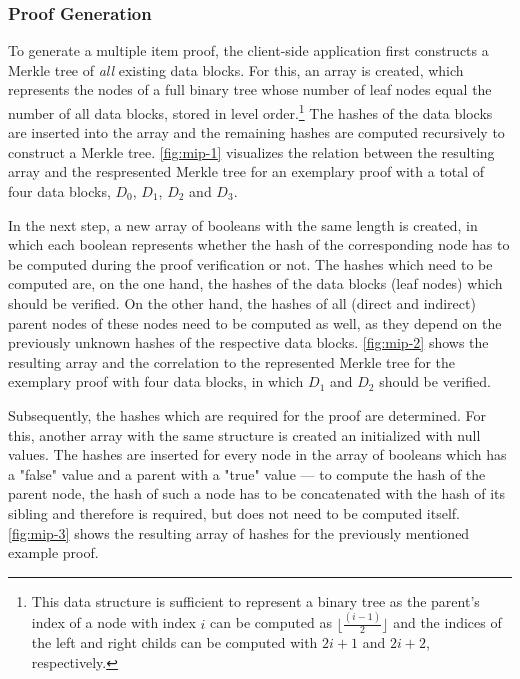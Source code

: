 		\subsubsection*{Proof Generation}
		\label{subsec:mip-generation}

			To generate a multiple item proof, the client-side application first constructs a Merkle tree of \emph{all} existing data blocks.
			For this, an array is created, which represents the nodes of a full binary tree whose number of leaf nodes equal the number of all data blocks, stored in level order.\footnote{This data structure is sufficient to represent a binary tree as the parent's index of a node with index $i$ can be computed as $\lfloor\frac{(i - 1)}2\rfloor$ and the indices of the left and right childs can be computed with $2i + 1$ and $2i + 2$, respectively.} The hashes of the data blocks are inserted into the array and the remaining hashes are computed recursively to construct a Merkle tree.
			\autoref{fig:mip-1} visualizes the relation between the resulting array and the respresented Merkle tree for an exemplary proof with a total of four data blocks, $D_0$, $D_1$, $D_2$ and $D_3$.

			In the next step, a new array of booleans with the same length is created, in which each boolean represents whether the hash of the corresponding node has to be computed during the proof verification or not.
			The hashes which need to be computed are, on the one hand, the hashes of the data blocks (leaf nodes) which should be verified.
			On the other hand, the hashes of all (direct and indirect) parent nodes of these nodes need to be computed as well, as they depend on the previously unknown hashes of the respective data blocks.
			\autoref{fig:mip-2} shows the resulting array and the correlation to the represented Merkle tree for the exemplary proof with four data blocks, in which $D_1$ and $D_2$ should be verified.

			Subsequently, the hashes which are required for the proof are determined.
			For this, another array with the same structure is created an initialized with null values.
			The hashes are inserted for every node in the array of booleans which has a "false" value and a parent with a "true" value --- to compute the hash of the parent node, the hash of such a node has to be concatenated with the hash of its sibling and therefore is required, but does not need to be computed itself.
			\autoref{fig:mip-3} shows the resulting array of hashes for the previously mentioned example proof.


